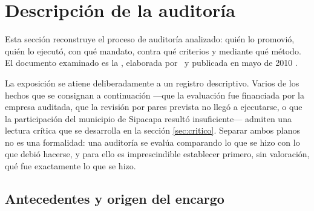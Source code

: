 %
%

\section{Descripción de la auditoría}
\label{sec:auditoria}

Esta sección reconstruye el proceso de auditoría analizado: quién lo promovió,
quién lo ejecutó, con qué mandato, contra qué criterios y mediante qué método. El
documento examinado es la \hria, elaborada por \auditora\ y publicada en mayo de
2010 \parencite{oncommonground2010hria}.

La exposición se atiene deliberadamente a un registro descriptivo. Varios de los
hechos que se consignan a continuación —que la evaluación fue financiada por la
empresa auditada, que la revisión por pares prevista no llegó a ejecutarse, o que
la participación del municipio de Sipacapa resultó insuficiente— admiten una
lectura crítica que se desarrolla en la sección \ref{sec:critico}. Separar ambos
planos no es una formalidad: una auditoría se evalúa comparando lo que se hizo
con lo que debió hacerse, y para ello es imprescindible establecer primero, sin
valoración, qué fue exactamente lo que se hizo.

\subsection{Antecedentes y origen del encargo}

